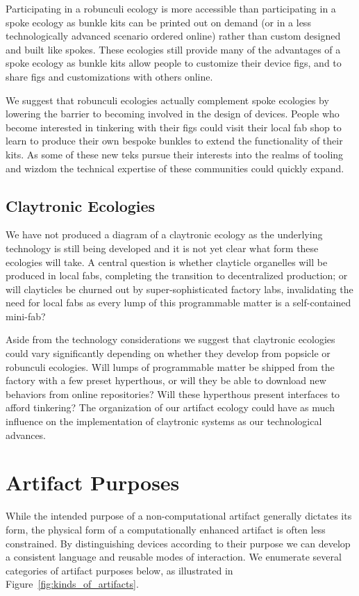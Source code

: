Participating in a robunculi ecology is more accessible than participating in a spoke ecology as bunkle kits can be printed out on demand (or in a less technologically advanced scenario ordered online) rather than custom designed and built like spokes. These ecologies still provide many of the advantages of a spoke ecology as bunkle kits allow people to customize their device figs, and to share figs and customizations with others online.

We suggest that robunculi ecologies actually complement spoke ecologies by lowering the barrier to becoming involved in the design of devices. 
People who become interested in tinkering with their figs could visit their local fab shop to learn to produce their own bespoke bunkles to extend the functionality of their kits.
As some of these new teks pursue their interests into the realms of tooling and wizdom the technical expertise of these communities could quickly expand.

\subsection{Claytronic Ecologies}    
%
We have not produced a diagram of a claytronic ecology as the underlying technology is still being developed and it is not yet clear what form these ecologies will take. 
A central question is whether clayticle organelles will be produced in local fabs, completing the transition to decentralized production; or will clayticles be churned out by super-sophisticated factory labs, invalidating the need for local fabs as every lump of this programmable matter is a self-contained mini-fab?

Aside from the technology considerations we suggest that claytronic ecologies could vary significantly depending on whether they develop from popsicle or robunculi ecologies. Will lumps of programmable matter be shipped from the factory with a few preset hyperthous, or will they be able to download new behaviors from online repositories? Will these hyperthous present interfaces to afford tinkering? The organization of our artifact ecology could have as much influence on the implementation of claytronic systems as our technological advances.

\section{Artifact Purposes}
\label{sec:purposes}
%
While the intended purpose of a non-computational artifact generally dictates its form, the physical form of a computationally enhanced artifact is often less constrained. 
By distinguishing devices according to their purpose we can develop a consistent language and reusable modes of interaction. 
We enumerate several categories of artifact purposes below, as illustrated in Figure~\ref{fig:kinds_of_artifacts}. 


